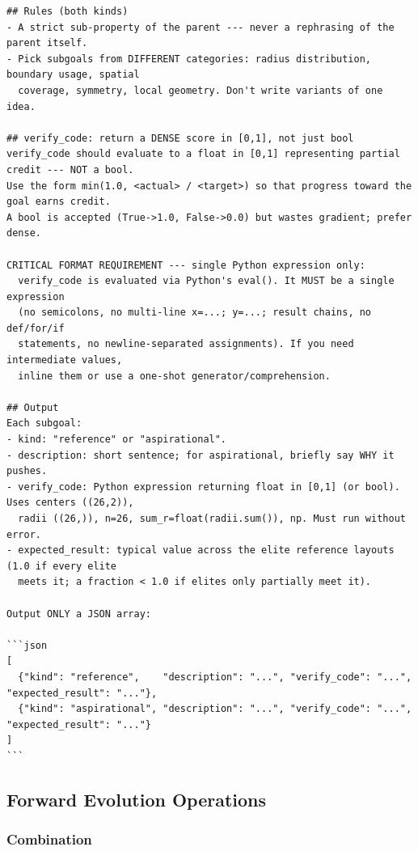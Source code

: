 \begin{ttcolorbox}
\begin{lstlisting}[style=prompt]
## Rules (both kinds)
- A strict sub-property of the parent --- never a rephrasing of the parent itself.
- Pick subgoals from DIFFERENT categories: radius distribution, boundary usage, spatial
  coverage, symmetry, local geometry. Don't write variants of one idea.

## verify_code: return a DENSE score in [0,1], not just bool
verify_code should evaluate to a float in [0,1] representing partial credit --- NOT a bool.
Use the form min(1.0, <actual> / <target>) so that progress toward the goal earns credit.
A bool is accepted (True->1.0, False->0.0) but wastes gradient; prefer dense.

CRITICAL FORMAT REQUIREMENT --- single Python expression only:
  verify_code is evaluated via Python's eval(). It MUST be a single expression
  (no semicolons, no multi-line x=...; y=...; result chains, no def/for/if
  statements, no newline-separated assignments). If you need intermediate values,
  inline them or use a one-shot generator/comprehension.

## Output
Each subgoal:
- kind: "reference" or "aspirational".
- description: short sentence; for aspirational, briefly say WHY it pushes.
- verify_code: Python expression returning float in [0,1] (or bool). Uses centers ((26,2)),
  radii ((26,)), n=26, sum_r=float(radii.sum()), np. Must run without error.
- expected_result: typical value across the elite reference layouts (1.0 if every elite
  meets it; a fraction < 1.0 if elites only partially meet it).

Output ONLY a JSON array:

```json
[
  {"kind": "reference",    "description": "...", "verify_code": "...", "expected_result": "..."},
  {"kind": "aspirational", "description": "...", "verify_code": "...", "expected_result": "..."}
]
```
\end{lstlisting}
\end{ttcolorbox}

\subsection{Forward Evolution Operations}
\label{app:prompts:forward}



\subsubsection{Combination}
\label{app:prompts:combination}


